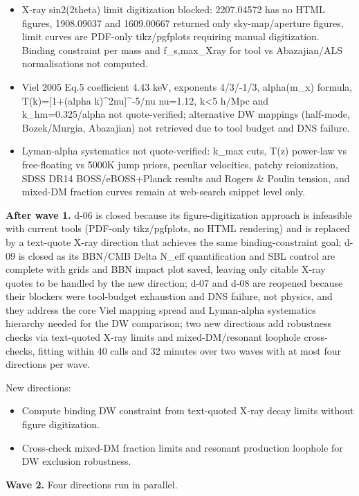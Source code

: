 \documentclass[11pt,a4paper]{article}
\begin{document}
\begin{itemize}
  \item X-ray sin2(2theta) limit digitization blocked: 2207.04572 has no HTML figures, 1908.09037 and 1609.00667 returned only sky-map/aperture figures, limit curves are PDF-only tikz/pgfplots requiring manual digitization. Binding constraint per mass and f\_s,max\_Xray for tool vs Abazajian/ALS normalisations not computed.
  \item Viel 2005 Eq.5 coefficient 4.43 keV, exponents 4/3/-1/3, alpha(m\_x) formula, T(k)=[1+(alpha k)\textasciicircum{}2nu]\textasciicircum{}-5/nu nu=1.12, k\textless{}5 h/Mpc and k\_hm=0.325/alpha not quote-verified; alternative DW mappings (half-mode, Bozek/Murgia, Abazajian) not retrieved due to tool budget and DNS failure.
  \item Lyman-alpha systematics not quote-verified: k\_max cuts, T(z) power-law vs free-floating vs 5000K jump priors, peculiar velocities, patchy reionization, SDSS DR14 BOSS/eBOSS+Planck results and Rogers \& Poulin tension, and mixed-DM fraction curves remain at web-search snippet level only.
\end{itemize}
\textbf{After wave 1.} d-06 is closed because its figure-digitization approach is infeasible with current tools (PDF-only tikz/pgfplots, no HTML rendering) and is replaced by a text-quote X-ray direction that achieves the same binding-constraint goal; d-09 is closed as its BBN/CMB Delta N\_eff quantification and SBL control are complete with grids and BBN impact plot saved, leaving only citable X-ray quotes to be handled by the new direction; d-07 and d-08 are reopened because their blockers were tool-budget exhaustion and DNS failure, not physics, and they address the core Viel mapping spread and Lyman-alpha systematics hierarchy needed for the DW comparison; two new directions add robustness checks via text-quoted X-ray limits and mixed-DM/resonant loophole cross-checks, fitting within 40 calls and 32 minutes over two waves with at most four directions per wave.

New directions:

\begin{itemize}
  \item Compute binding DW constraint from text-quoted X-ray decay limits without figure digitization.
  \item Cross-check mixed-DM fraction limits and resonant production loophole for DW exclusion robustness.
\end{itemize}
\textbf{Wave 2.} Four directions run in parallel.
\end{document}
